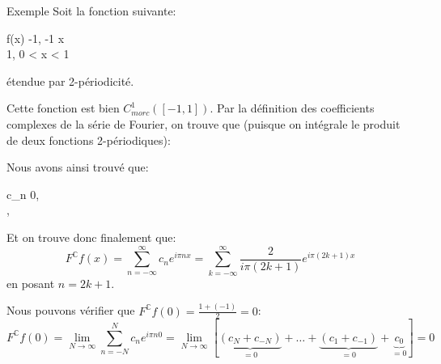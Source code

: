 \documentclass[a4paper]{article}
\begin{document}
\begin{parag}{Exemple}
    Soit la fonction suivante:
    \begin{functionbypart}{f\left(x\right)}
    -1, \mathspace {} -1 \leq x  \\
    1, \mathspace {} 0 < x < 1
    \end{functionbypart}
    étendue par 2-périodicité.


    Cette fonction est bien $C^1_{morc}\left(\left[-1, 1\right]\right)$. Par la définition des coefficients complexes de la série de Fourier, on trouve que (puisque on intégrale le produit de deux fonctions 2-périodiques): 

    Nous avons ainsi trouvé que:
    \begin{functionbypart}{c_n}
    0, \mathspace {}  \\
    , \mathspace {} 
    \end{functionbypart}

    Et on trouve donc finalement que: 
    \[F^{\mathbb{C}} f\left(x\right) = \sum_{n=-\infty}^{\infty} c_n e^{i \pi n x} = \sum_{k=-\infty}^{\infty} \frac{2}{i\pi\left(2k +1\right)} e^{i \pi \left(2k + 1\right)x}\]
    en posant $n = 2k + 1$.
    
    Nous pouvons vérifier que $F^{\mathbb{C}} f\left(0\right) = \frac{1 + \left(-1\right)}{2} = 0$: 
    \[F^{\mathbb{C}} f\left(0\right) = \lim_{N \to \infty} \sum_{n=-N}^{N} c_n e^{i \pi n 0} = \lim_{N \to \infty} \left[\underbrace{\left(c_N + c_{-N}\right)}_{= 0} + \ldots + \underbrace{\left(c_1 + c_{-1}\right)}_{= 0} + \underbrace{c_0}_{= 0}\right] = 0\]
\end{parag}
\end{document}
